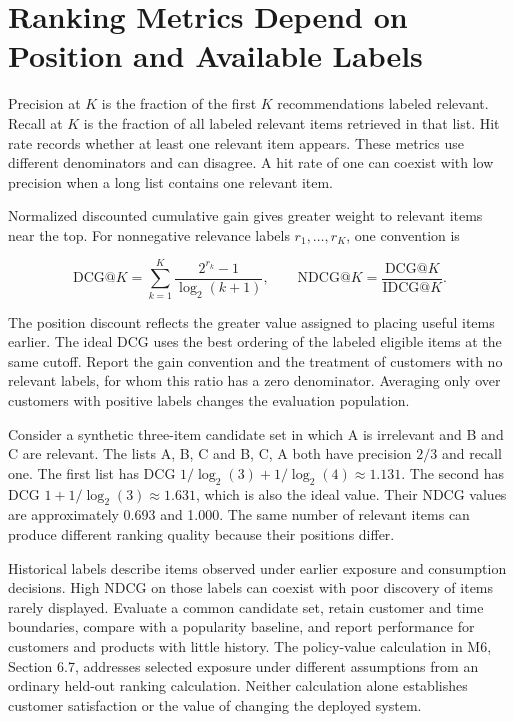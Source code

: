 \hypertarget{M07-ranking-metrics-depend-on-position-and-available-labels}{%
\section{Ranking Metrics Depend on Position and Available
Labels}\label{M07-ranking-metrics-depend-on-position-and-available-labels}}

\noindent Precision at \(K\) is the fraction of the first \(K\) recommendations
labeled relevant. Recall at \(K\) is the fraction of all labeled
relevant items retrieved in that list. Hit rate records whether at least
one relevant item appears. These metrics use different denominators and
can disagree. A hit rate of one can coexist with low precision when a
long list contains one relevant item.

Normalized discounted cumulative gain gives greater weight to relevant
items near the top. For nonnegative relevance labels \(r_1,\ldots,r_K\),
one convention is

\[
\mathrm{DCG}@K=\sum_{k=1}^{K}\frac{2^{r_k}-1}{\log_2(k+1)},
\qquad
\mathrm{NDCG}@K=\frac{\mathrm{DCG}@K}{\mathrm{IDCG}@K}.
\]

The position discount reflects the greater value assigned to placing
useful items earlier. The ideal DCG uses the best ordering of the
labeled eligible items at the same cutoff. Report the gain convention
and the treatment of customers with no relevant labels, for whom this
ratio has a zero denominator. Averaging only over customers with
positive labels changes the evaluation population.

Consider a synthetic three-item candidate set in which A is irrelevant
and B and C are relevant. The lists A, B, C and B, C, A both have
precision \(2/3\) and recall one. The first list has DCG
\(1/\log_2(3)+1/\log_2(4)\approx1.131\). The second has DCG
\(1+1/\log_2(3)\approx1.631\), which is also the ideal value. Their NDCG
values are approximately 0.693 and 1.000. The same number of relevant
items can produce different ranking quality because their positions
differ.

Historical labels describe items observed under earlier exposure and
consumption decisions. High NDCG on those labels can coexist with poor
discovery of items rarely displayed. Evaluate a common candidate set,
retain customer and time boundaries, compare with a popularity baseline,
and report performance for customers and products with little history.
The policy-value calculation in M6, Section 6.7, addresses selected
exposure under different assumptions from an ordinary held-out ranking
calculation. Neither calculation alone establishes customer satisfaction
or the value of changing the deployed system.

